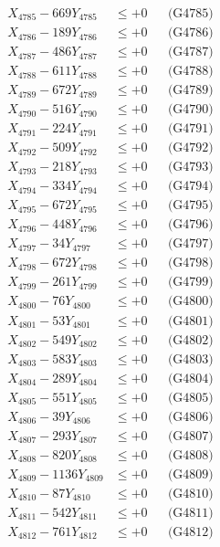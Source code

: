 \documentclass[a4paper,10pt]{article}
\begin{document}
{\begin{align}
X_{4785} - 669Y_{4785} &\leq +0 && \text{(G4785)} \\
X_{4786} - 189Y_{4786} &\leq +0 && \text{(G4786)} \\
X_{4787} - 486Y_{4787} &\leq +0 && \text{(G4787)} \\
X_{4788} - 611Y_{4788} &\leq +0 && \text{(G4788)} \\
X_{4789} - 672Y_{4789} &\leq +0 && \text{(G4789)} \\
X_{4790} - 516Y_{4790} &\leq +0 && \text{(G4790)} \\
\allowbreak
X_{4791} - 224Y_{4791} &\leq +0 && \text{(G4791)} \\
X_{4792} - 509Y_{4792} &\leq +0 && \text{(G4792)} \\
X_{4793} - 218Y_{4793} &\leq +0 && \text{(G4793)} \\
X_{4794} - 334Y_{4794} &\leq +0 && \text{(G4794)} \\
X_{4795} - 672Y_{4795} &\leq +0 && \text{(G4795)} \\
X_{4796} - 448Y_{4796} &\leq +0 && \text{(G4796)} \\
X_{4797} - 34Y_{4797} &\leq +0 && \text{(G4797)} \\
X_{4798} - 672Y_{4798} &\leq +0 && \text{(G4798)} \\
X_{4799} - 261Y_{4799} &\leq +0 && \text{(G4799)} \\
X_{4800} - 76Y_{4800} &\leq +0 && \text{(G4800)} \\
\allowbreak
X_{4801} - 53Y_{4801} &\leq +0 && \text{(G4801)} \\
X_{4802} - 549Y_{4802} &\leq +0 && \text{(G4802)} \\
X_{4803} - 583Y_{4803} &\leq +0 && \text{(G4803)} \\
X_{4804} - 289Y_{4804} &\leq +0 && \text{(G4804)} \\
X_{4805} - 551Y_{4805} &\leq +0 && \text{(G4805)} \\
X_{4806} - 39Y_{4806} &\leq +0 && \text{(G4806)} \\
X_{4807} - 293Y_{4807} &\leq +0 && \text{(G4807)} \\
X_{4808} - 820Y_{4808} &\leq +0 && \text{(G4808)} \\
X_{4809} - 1136Y_{4809} &\leq +0 && \text{(G4809)} \\
X_{4810} - 87Y_{4810} &\leq +0 && \text{(G4810)} \\
\allowbreak
X_{4811} - 542Y_{4811} &\leq +0 && \text{(G4811)} \\
X_{4812} - 761Y_{4812} &\leq +0 && \text{(G4812)} \\

\end{align}}
\end{document}
